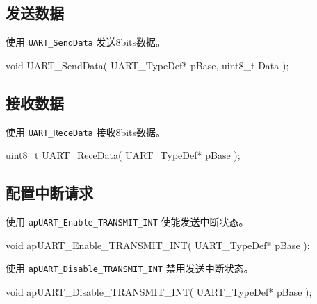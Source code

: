 \documentclass[
  12pt,
]{book}
\newenvironment{Shaded}{\begin{snugshade}}{\end{snugshade}}
\newcommand{\DataTypeTok}[1]{\textcolor[rgb]{0.13,0.29,0.53}{#1}}
\newcommand{\NormalTok}[1]{#1}
\begin{document}
\hypertarget{ux53d1ux9001ux6570ux636e}{%
\subsection{发送数据}\label{ux53d1ux9001ux6570ux636e}}

使用 \texttt{UART\_SendData} 发送8bits数据。

\begin{Shaded}
\begin{Highlighting}[]
\DataTypeTok{void}\NormalTok{ UART_SendData(}
\NormalTok{  UART_TypeDef* pBase, }
  \DataTypeTok{uint8_t}\NormalTok{ Data}
\NormalTok{  );}
\end{Highlighting}
\end{Shaded}

\hypertarget{ux63a5ux6536ux6570ux636e}{%
\subsection{接收数据}\label{ux63a5ux6536ux6570ux636e}}

使用 \texttt{UART\_ReceData} 接收8bits数据。

\begin{Shaded}
\begin{Highlighting}[]
\DataTypeTok{uint8_t}\NormalTok{ UART_ReceData(}
\NormalTok{  UART_TypeDef* pBase}
\NormalTok{  );}
\end{Highlighting}
\end{Shaded}

\hypertarget{ux914dux7f6eux4e2dux65adux8bf7ux6c42-3}{%
\subsection{配置中断请求}\label{ux914dux7f6eux4e2dux65adux8bf7ux6c42-3}}

使用 \texttt{apUART\_Enable\_TRANSMIT\_INT} 使能发送中断状态。

\begin{Shaded}
\begin{Highlighting}[]
\DataTypeTok{void}\NormalTok{ apUART_Enable_TRANSMIT_INT(}
\NormalTok{  UART_TypeDef* pBase}
\NormalTok{  );}
\end{Highlighting}
\end{Shaded}

使用 \texttt{apUART\_Disable\_TRANSMIT\_INT} 禁用发送中断状态。

\begin{Shaded}
\begin{Highlighting}[]
\DataTypeTok{void}\NormalTok{ apUART_Disable_TRANSMIT_INT(}
\NormalTok{  UART_TypeDef* pBase}
\NormalTok{  );}
\end{Highlighting}
\end{Shaded}
\end{document}
